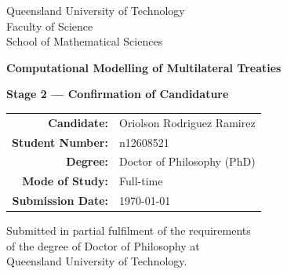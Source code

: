 \begin{titlepage}
  \begin{center}
    \vspace*{2cm}

    {\Large Queensland University of Technology}\\[0.5em]
    {\large Faculty of Science}\\[0.5em]
    {\large School of Mathematical Sciences}

    \vspace{2.5cm}

    {\LARGE\bfseries
      Computational Modelling of Multilateral Treaties\\[0.4em]
    }

    \vspace{2cm}

    \textbf{Stage 2 — Confirmation of Candidature}

    \vspace{1.5cm}

    \begin{tabular}{rl}
      \textbf{Candidate:}        & Oriolson Rodriguez Ramirez\\[4pt]
      \textbf{Student Number:}   & n12608521 \\[4pt]
      \textbf{Degree:}           & Doctor of Philosophy (PhD) \\[4pt]
      \textbf{Mode of Study:}    & Full-time \\[4pt]
      \textbf{Submission Date:}  & \today \\
    \end{tabular}

    \vfill

    {\small
      Submitted in partial fulfilment of the requirements\\
      of the degree of Doctor of Philosophy at\\
      Queensland University of Technology.
    }
  \end{center}
\end{titlepage}